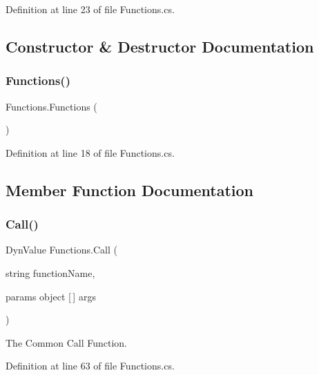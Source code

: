 Definition at line 23 of file Functions.\+cs.



\subsection{Constructor \& Destructor Documentation}
\mbox{\label{class_functions_af3dc73628755a9edc419081bdaddba40}} 
\subsubsection{\texorpdfstring{Functions()}{Functions()}}
{\footnotesize\ttfamily Functions.\+Functions (\begin{DoxyParamCaption}{ }\end{DoxyParamCaption})}



Definition at line 18 of file Functions.\+cs.



\subsection{Member Function Documentation}
\mbox{\label{class_functions_ae33add32d22cc0eea74eaca446e03111}} 
\subsubsection{\texorpdfstring{Call()}{Call()}\hspace{0.1cm}{\footnotesize\ttfamily [1/2]}}
{\footnotesize\ttfamily Dyn\+Value Functions.\+Call (\begin{DoxyParamCaption}\item[{string}]{function\+Name,  }\item[{params object \mbox{[}$\,$\mbox{]}}]{args }\end{DoxyParamCaption})}



The Common Call Function. 



Definition at line 63 of file Functions.\+cs.

\mbox{\label{class_functions_a32d1bcb840da0bfa692dfa5fc7bfff06}} 
